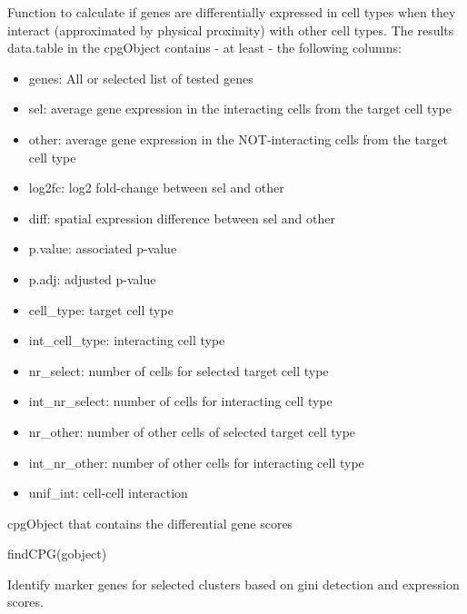 \documentclass[a4paper]{book}
\begin{document}
\begin{Details}\relax
Function to calculate if genes are differentially expressed in cell types
when they interact (approximated by physical proximity) with other cell types.
The results data.table in the cpgObject contains - at least - the following columns:
\begin{itemize}

\item{} genes: All or selected list of tested genes
\item{} sel: average gene expression in the interacting cells from the target cell type 
\item{} other: average gene expression in the NOT-interacting cells from the target cell type 
\item{} log2fc: log2 fold-change between sel and other
\item{} diff: spatial expression difference between sel and other
\item{} p.value: associated p-value
\item{} p.adj: adjusted p-value
\item{} cell\_type: target cell type
\item{} int\_cell\_type: interacting cell type
\item{} nr\_select: number of cells for selected target cell type
\item{} int\_nr\_select: number of cells for interacting cell type
\item{} nr\_other: number of other cells of selected target cell type
\item{} int\_nr\_other: number of other cells for interacting cell type
\item{} unif\_int: cell-cell interaction

\end{itemize}

\end{Details}
%
\begin{Value}
cpgObject that contains the differential gene scores
\end{Value}
%
\begin{Examples}
\begin{ExampleCode}
    findCPG(gobject)
\end{ExampleCode}
\end{Examples}
%
\begin{Description}\relax
Identify marker genes for selected clusters based on gini detection and expression scores.
\end{Description}
\end{document}

